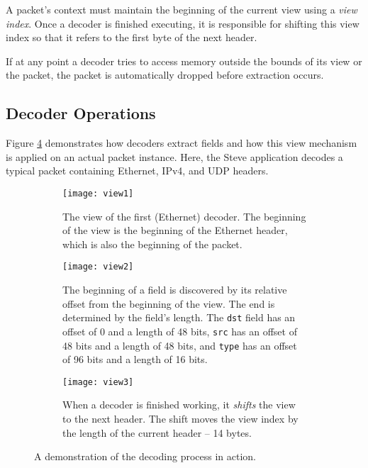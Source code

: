 A packet's context must maintain the beginning of the current view using
a \emph{view index}. Once a decoder is finished executing, it is
responsible for shifting this view index so that it refers to the
first byte of the next header.

If at any point a decoder tries to access memory outside the bounds of its
view or the packet, the packet is automatically dropped before extraction occurs.

\subsection{Decoder Operations} \label{tut:extract_how}

Figure \ref{fg:decoding} demonstrates how decoders extract fields and
how this view mechanism is applied on an actual packet instance. 
Here, the Steve application decodes a typical packet 
containing Ethernet, IPv4, and UDP headers.

\begin{figure}
\begin{subfigure}[t, scale=0.5]{.45\textwidth}
  \centering
  \texttt{[image: view1]}
  \caption{The view of the first (Ethernet) decoder. 
  The beginning of the view is the beginning of the Ethernet
  header, which is also the beginning of the packet.}
  \label{fg:view1}
\end{subfigure}%
\hfill
\begin{subfigure}[t, scale=0.5]{0.45\textwidth}
  \centering
  \texttt{[image: view2]}
  \caption{The beginning of a field is discovered by its relative offset from
the beginning of the view. The end is determined by the field's length. The \texttt{dst} field has an offset of 0 and a length of 48 bits, 	\texttt{src} has an offset of 48 bits and a length of 48 bits, and \texttt{type} has an offset of 96 bits and a length of 16 bits.}
  \label{fg:view2}
\end{subfigure}

\begin{subfigure}[t]{.45\textwidth}
  \centering
  \texttt{[image: view3]}
  \caption{When a decoder is finished working, it \textit{shifts} the view to
the next header. The shift moves the view index by the length of the current
header -- 14 bytes.}
  \label{fg:view3}
\end{subfigure}%
\caption{A demonstration of the decoding process in action.}
\label{fg:decoding}
\end{figure}
 
